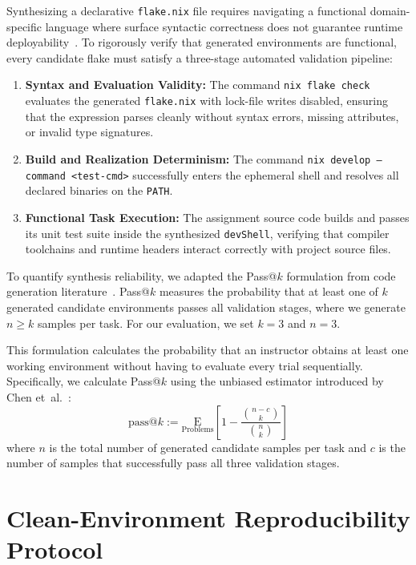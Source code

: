 Synthesizing a declarative \texttt{flake.nix} file requires navigating a
functional domain-specific language where surface syntactic correctness does not
guarantee runtime deployability~\cite{zhangDeployabilityCentricInfrastructureasCodeGeneration2025}.
To rigorously verify that generated environments are functional, every candidate
flake must satisfy a three-stage automated validation pipeline:
\begin{enumerate}
	\item \textbf{Syntax and Evaluation Validity:} The command \texttt{nix flake
		      check} evaluates the generated \texttt{flake.nix} with lock-file writes
	      disabled, ensuring that the expression parses cleanly without syntax errors,
	      missing attributes, or invalid type signatures.

	\item \textbf{Build and Realization Determinism:} The command \texttt{nix
		      develop --command <test-cmd>} successfully enters the ephemeral shell and
	      resolves all declared binaries on the \texttt{PATH}.

	\item \textbf{Functional Task Execution:} The assignment source code builds
	      and passes its unit test suite inside the synthesized \texttt{devShell},
	      verifying that compiler toolchains and runtime headers interact
	      correctly with project source files.
\end{enumerate}

To quantify synthesis reliability, we adapted the Pass@$k$ formulation from code
generation literature~\cite{chenEvaluatingLargeLanguage2021}. Pass@$k$ measures
the probability that at least one of $k$ generated candidate environments passes
all validation stages, where we generate $n \ge k$ samples per task. For our
evaluation, we set $k = 3$ and $n = 3$.

This formulation calculates the probability that an instructor obtains at least one
working environment without having to evaluate every trial sequentially.
Specifically, we calculate Pass@$k$ using the unbiased estimator introduced by
Chen et~al.~\cite{chenEvaluatingLargeLanguage2021}:
\[
	\mathrm{pass@}k := \underset{\text{Problems}}{\mathrm{E}}\left[ 1 - \frac{\binom{n-c}{k}}{\binom{n}{k}}
		\right]
\]
where $n$ is the total number of generated candidate samples per task and $c$ is
the number of samples that successfully pass all three validation stages.

\section{Clean-Environment Reproducibility Protocol}
\label{sec:rq2-methodology}

